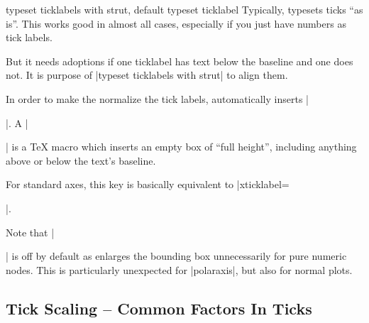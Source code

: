 \begin{pgfplotskeylist}{%
    typeset ticklabels with strut,
    default typeset ticklabel%
}
    Typically, \PGFPlots{} typesets ticks ``as is''. This works good in almost
    all cases, especially if you just have numbers as tick labels.

    But it needs adoptions if one ticklabel has text below the baseline and one
    does not. It is purpose of |typeset ticklabels with strut| to align them.
\begin{codeexample}[]
\end{codeexample}

    In order to make the normalize the tick labels, \PGFPlots{} automatically
    inserts |\strut|. A |\strut| is a \TeX{} macro which inserts an empty box
    of ``full height'', including anything above or below the text's baseline.

    For standard axes, this key is basically equivalent to
    |xticklabel=\strut\pgfmathprintnumber{\tick}|.

    Note that |\strut| is off by default as enlarges the bounding box
    unnecessarily for pure numeric nodes. This is particularly unexpected for
    |polaraxis|, but also for normal plots.
\end{pgfplotskeylist}


\subsection{Tick Scaling -- Common Factors In Ticks}
\label{sec:scaled:ticks}

